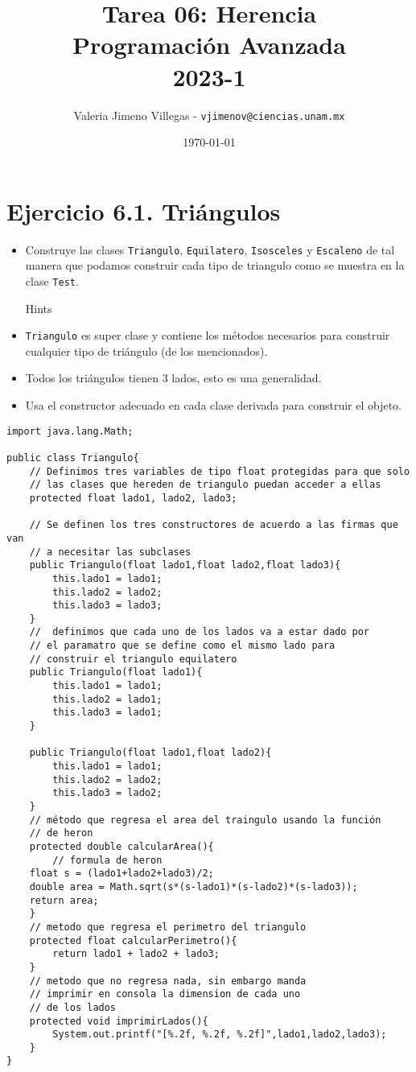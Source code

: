 \documentclass[11pt, oneside]{article}
\title{Tarea 06: Herencia \\[5pt] \normalsize Programación Avanzada  \\[5pt] 2023-1 }
\author{Valeria Jimeno Villegas - \texttt{vjimenov@ciencias.unam.mx}}
\date{\today}
\begin{document}
\maketitle

\section*{Ejercicio 6.1. Triángulos}

\begin{itemize}

\item Construye las clases {\tt Triangulo}, {\tt Equilatero}, {\tt Isosceles} y 
{\tt Escaleno} de tal manera que podamos construir cada tipo de triangulo como se
muestra en la clase {\tt Test}.

Hints

\item {\tt Triangulo} es super clase y contiene los métodos necesarios para construir cualquier tipo de triángulo (de los mencionados).
\item Todos los triángulos tienen 3 lados, esto es una generalidad.
\item Usa el constructor adecuado en cada clase derivada para construir el objeto.
\end{itemize}


\begin{verbatim}
import java.lang.Math;

public class Triangulo{
    // Definimos tres variables de tipo float protegidas para que solo
    // las clases que hereden de triangulo puedan acceder a ellas
    protected float lado1, lado2, lado3; 

    // Se definen los tres constructores de acuerdo a las firmas que van
    // a necesitar las subclases
    public Triangulo(float lado1,float lado2,float lado3){
        this.lado1 = lado1;
        this.lado2 = lado2;
        this.lado3 = lado3;
    }
    //  definimos que cada uno de los lados va a estar dado por 
    // el paramatro que se define como el mismo lado para 
    // construir el triangulo equilatero
    public Triangulo(float lado1){
        this.lado1 = lado1;
        this.lado2 = lado1;
        this.lado3 = lado1;
    }

    public Triangulo(float lado1,float lado2){
        this.lado1 = lado1;
        this.lado2 = lado2;
        this.lado3 = lado2;
    }
    // método que regresa el area del traingulo usando la función 
    // de heron
    protected double calcularArea(){
        // formula de heron
    float s = (lado1+lado2+lado3)/2;
    double area = Math.sqrt(s*(s-lado1)*(s-lado2)*(s-lado3));
    return area;
    }
    // metodo que regresa el perimetro del triangulo 
    protected float calcularPerimetro(){
        return lado1 + lado2 + lado3;
    }
    // metodo que no regresa nada, sin embargo manda 
    // imprimir en consola la dimension de cada uno 
    // de los lados
    protected void imprimirLados(){
        System.out.printf("[%.2f, %.2f, %.2f]",lado1,lado2,lado3);
    }
}
\end{verbatim}
\end{document}
